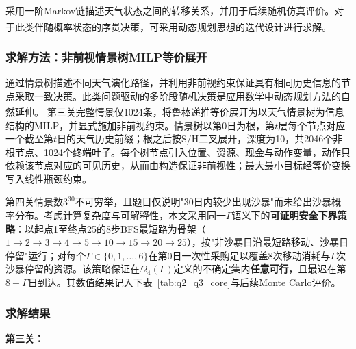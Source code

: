 \documentclass{cumcmthesis}
\numberwithin{equation}{section}
\numberwithin{figure}{section}
\numberwithin{table}{section}
\begin{document}
采用一阶Markov链描述天气状态之间的转移关系，并用于后续随机仿真评价。对于此类伴随概率状态的序贯决策，可采用动态规划思想的迭代设计进行求解\textsuperscript{\cite{heyichao2016}}。
 \vspace{-10pt} 
\subsubsection{求解方法：非前视情景树MILP等价展开}

通过情景树描述不同天气演化路径，并利用非前视约束保证具有相同历史信息的节点采取一致决策。此类问题驱动的多阶段随机决策是应用数学中动态规划方法的自然延伸\textsuperscript{\cite{lidaqian2014}}。
第三关完整情景仅1024条，将鲁棒递推等价展开为以天气情景树为信息结构的MILP，并显式施加非前视约束。情景树以第0日为根，第$t$层每个节点对应一个截至第$t$日的天气历史前缀；根之后按S/H二叉展开，深度为10，共2046个非根节点、1024个终端叶子。每个树节点引入位置、资源、现金与动作变量，动作只依赖该节点对应的可见历史，从而由构造保证非前视性；最大最小目标经等价变换写入线性瓶颈约束。

第四关情景数$3^{30}$不可穷举，且题目仅说明"30日内较少出现沙暴"而未给出沙暴概率分布。考虑计算复杂度与可解释性，本文采用同一$\Gamma$语义下的\textbf{可证明安全下界策略}：以起点1至终点25的8步BFS最短路为骨架（$1\to2\to3\to4\to5\to10\to15\to20\to25$），按"非沙暴日沿最短路移动、沙暴日停留"运行；对每个$\Gamma\in\{0,1,\dots,6\}$在第0日一次性采购足以覆盖8次移动消耗与$\Gamma$次沙暴停留的资源。该策略保证在$\Omega_4(\Gamma)$定义的不确定集内\textbf{任意可行}，且最迟在第$8+\Gamma$日到达。其数值结果记入下表~\ref{tab:q2_q3_core}与后续Monte Carlo评价。
 \vspace{-10pt} 
\subsubsection{求解结果}

\textbf{第三关：}
\end{document}
